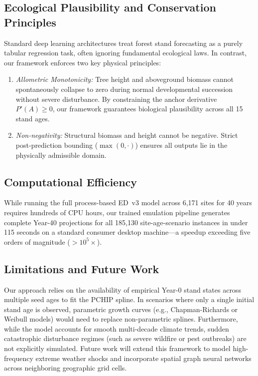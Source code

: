\documentclass[conference]{IEEEtran}
\begin{document}
\subsection{Ecological Plausibility and Conservation Principles}
Standard deep learning architectures treat forest stand forecasting as a purely tabular regression task, often ignoring fundamental ecological laws. In contrast, our framework enforces two key physical principles:
\begin{enumerate}
    \item \textit{Allometric Monotonicity:} Tree height and aboveground biomass cannot spontaneously collapse to zero during normal developmental succession without severe disturbance. By constraining the anchor derivative $P'(A) \ge 0$, our framework guarantees biological plausibility across all 15 stand ages.
    \item \textit{Non-negativity:} Structural biomass and height cannot be negative. Strict post-prediction bounding ($\max(0, \cdot)$) ensures all outputs lie in the physically admissible domain.
\end{enumerate}

\subsection{Computational Efficiency}
While running the full process-based ED~v3 model across 6,171 sites for 40 years requires hundreds of CPU hours, our trained emulation pipeline generates complete Year-40 projections for all 185,130 site-age-scenario instances in under 115 seconds on a standard consumer desktop machine---a speedup exceeding five orders of magnitude ($>10^5\times$).

\subsection{Limitations and Future Work}
Our approach relies on the availability of empirical Year-0 stand states across multiple seed ages to fit the PCHIP spline. In scenarios where only a single initial stand age is observed, parametric growth curves (e.g., Chapman-Richards or Weibull models) would need to replace non-parametric splines. Furthermore, while the model accounts for smooth multi-decade climate trends, sudden catastrophic disturbance regimes (such as severe wildfire or pest outbreaks) are not explicitly simulated. Future work will extend this framework to model high-frequency extreme weather shocks and incorporate spatial graph neural networks across neighboring geographic grid cells.
\end{document}
